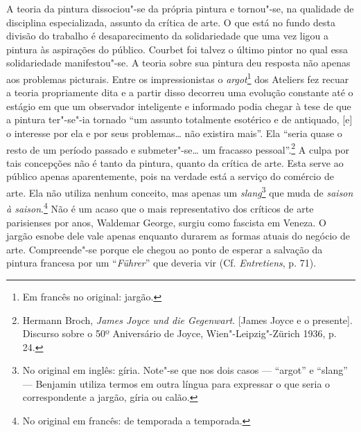 A teoria da pintura dissociou"-se da própria pintura e tornou"-se, na
qualidade de disciplina especializada, assunto da crítica de arte. O que
está no fundo desta divisão do trabalho é desaparecimento da
solidariedade que uma vez ligou a pintura às aspirações do público.
Courbet foi talvez o último pintor no qual essa solidariedade
manifestou"-se. A teoria sobre sua pintura deu resposta não apenas aos
problemas picturais. Entre os impressionistas o \emph{argot}\footnote{Em francês no original: jargão. \versal{[N. T.]}} dos Ateliers fez recuar a teoria
propriamente dita e a partir disso decorreu uma evolução constante até o
estágio em que um observador inteligente e informado podia chegar à tese
de que a pintura ter"-se"-ia tornado ``um assunto totalmente esotérico e %
de antiquado, {[}e{]} o interesse por ela e por seus problemas\ldots{} não
existira mais''. Ela ``seria quase o resto de um período passado e
submeter"-se\ldots{} um fracasso pessoal''.\footnote{Hermann Broch, \emph{James
  Joyce und die Gegenwart}. {[}James Joyce e o presente{]}. Discurso
  sobre o 50º Aniversário de Joyce, Wien"-Leipzig"-Zürich 1936, p. 24.} A
culpa por tais concepções não é tanto da pintura, quanto da crítica de
arte. Esta serve ao público apenas aparentemente, pois na verdade está a
serviço do comércio de arte. Ela não utiliza nenhum conceito, mas apenas
um \emph{slang}\footnote{No original em inglês: gíria. Note"-se que
  nos dois casos --- ``argot'' e ``slang'' --- Benjamin utiliza termos em
  outra língua para expressar o que seria o correspondente a jargão,
  gíria ou calão. \versal{[N. T.]}} que muda de \emph{saison à saison}.\footnote{No original em francês: de temporada a temporada. \versal{[N. T.]}} Não é um acaso que
o mais representativo dos críticos de arte parisienses por anos,
Waldemar George, surgiu como fascista em Veneza. O jargão esnobe dele
vale apenas enquanto durarem as formas atuais do negócio de arte.
Compreende"-se porque ele chegou ao ponto de esperar a salvação da
pintura francesa por um ``\emph{Führer}'' que deveria vir (Cf.
\emph{Entretiens}, p. 71).

